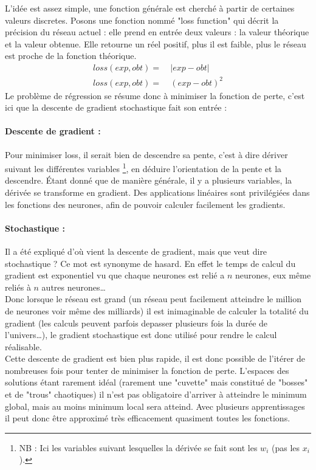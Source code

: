 L'idée est assez simple, une fonction générale est cherché à partir de certaines valeurs discretes.
Posons une fonction nommé "loss function" qui décrit la précision du réseau actuel :
elle prend en entrée deux valeurs : la valeur théorique et la valeur obtenue.
Elle retourne un réel positif, plus il est faible, plus le réseau est proche de la fonction théorique.
\exemle
{
\begin{align*}
    loss(exp, obt) = &\ |exp - obt| \\
    loss(exp, obt) = &\ (exp - obt)^2
\end{align*}
}
Le problème de régression se résume donc à minimiser la fonction de perte,
c'est ici que la descente de gradient stochastique fait son entrée :


\paragraph{Descente de gradient :}
Pour minimiser loss, il serait bien de descendre sa pente, c'est à dire dériver suivant les différentes variables
\footnote{\textsc{NB :} Ici les variables suivant lesquelles la dérivée se fait sont les $w_i$ (pas les $x_i$).},
en déduire l'orientation de la pente et la descendre.
Étant donné que de manière générale, il y a plusieurs variables, la dérivée se transforme en gradient.
Des applications linéaires sont privilégiées dans les fonctions des neurones,
afin de pouvoir calculer facilement les gradients.\\


\paragraph{Stochastique :}
Il a été expliqué d'où vient la descente de gradient, mais que veut dire stochastique ?
Ce mot est synonyme de hasard.
En effet le temps de calcul du gradient est exponentiel vu que chaque neurones est relié a $n$ neurones,
eux même reliés à $n$ autres neurones\ldots\\
Donc lorsque le réseau est grand
(un réseau peut facilement atteindre le million de neurones voir même des milliards\cite{i3espectrum})
il est inimaginable de calculer la totalité du gradient (les calculs peuvent parfois depasser
plusieurs fois la durée de l'univers\ldots),
le gradient stochastique est donc utilisé pour rendre le calcul réalisable.\\


Cette descente de gradient est bien plus rapide, il est donc possible de l'itérer de nombreuses fois
pour tenter de minimiser la fonction de perte.
L'espaces des solutions étant rarement idéal
(rarement une "cuvette" mais constitué de "bosses" et de "trous" chaotiques)
il n'est pas obligatoire d'arriver à atteindre le minimum global, mais au moins minimum local sera atteind.
Avec plusieurs apprentissages il peut donc être approximé très efficacement quasiment toutes les fonctions.
